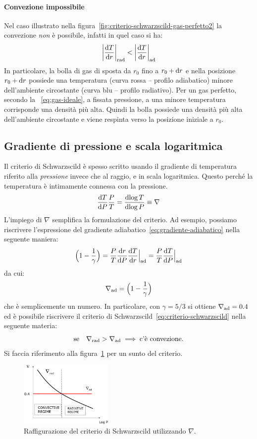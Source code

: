 \paragraph{Convezione impossibile}
Nel caso illustrato nella figura~\ref{fig:criterio-schwarzscild-gas-perfetto2} la convezione \emph{non} è possibile, infatti in quel caso si ha:
\[
\abs*{\dfrac{\ud T}{\ud r}}_\textup{rad} < \abs*{\dfrac{\ud T}{\ud r}}_\textup{ad}
\]
In particolare, la bolla di gas di sposta da $r_0$ fino a $r_0 + \ud r$ e nella posizione $r_0 + \ud r$ possiede una temperatura (curva rossa -- profilo adiabatico) minore dell'ambiente circostante (curva blu -- profilo radiativo). Per un gas perfetto, secondo la ~\eqref{eq:gas-ideale}, a fissata pressione, a una minore temperatura corrisponde una densità più alta. Quindi la bolla possiede una densità più alta dell'ambiente circostante e viene respinta verso la posizione iniziale a $r_0$.

\subsection{Gradiente di pressione e scala logaritmica}
Il criterio di Schwarzscild è spesso scritto usando il gradiente di temperatura riferito alla \emph{pressione} invece che al raggio, e in scala logaritmica. Questo perché la temperatura è intimamente connessa con la pressione.
\begin{equation}
    \dfrac{\ud T}{\ud P} \dfrac{P}{T} = \dfrac{\ud \log T}{\ud \log P} \equiv \nabla
\end{equation}
L'impiego di $\nabla$ semplifica la formulazione del criterio. Ad esempio, possiamo riscrivere l'espressione del gradiente adiabatico~\eqref{eq:gradiente-adiabatico} nella seguente maniera:
\[
\Bigl(1- \frac{1}{\gamma}\Bigr) = \dfrac{P}{T} \dfrac{\ud r}{\ud P} \dfrac{\ud T}{\ud r}\Big|_\textup{ad} = \dfrac{P}{T} \dfrac{\ud T}{\ud P}\Big|_\textup{ad}
\]
da cui:
\begin{equation}
    \nabla_\textup{ad} = \Bigl(1- \frac{1}{\gamma}\Bigr)
\end{equation}
che è semplicemente un numero. In particolare, con $\gamma = 5/3$ si ottiene $\nabla_\textup{ad} = 0.4$ ed è possibile riscrivere il criterio di Schwarzscild~\eqref{eq:criterio-schwarzscild} nella seguente materia:
\begin{equation}\label{eq:criterio-schwarzscild-nabla}
    \text{se} \quad \nabla_\textup{rad} > \nabla_\textup{ad} \implies \text{c'è convezione.}
\end{equation}
Si faccia riferimento alla figura~\ref{fig:criterio-schwarzscild-nabla} per un sunto del criterio.

\begin{figure}
\centering
\includegraphics[width=0.4\textwidth]{immagini/criterio-schwarzscild-nabla.png}
\caption{Raffigurazione del criterio di Schwarzscild utilizzando $\nabla$.}
\label{fig:criterio-schwarzscild-nabla}
\end{figure}